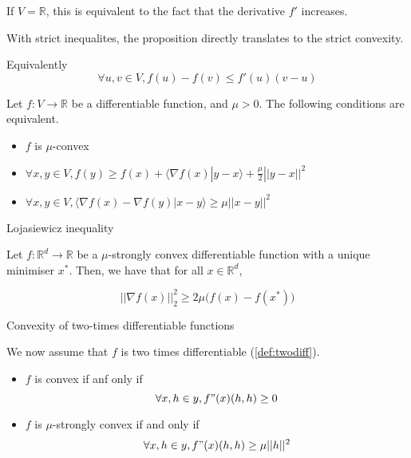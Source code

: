 \documentclass[
10pt, %
a4paper, %
oneside, %
headinclude,footinclude, %
BCOR5mm, %
]{scrartcl}
\begin{document}
\begin{remark}
    If $V=\mathbb{R}$, this is equivalent to the fact that the derivative $f'$ increases.
\end{remark}

\begin{remark}
    With strict inequalites, the proposition directly translates to the strict convexity.
\end{remark}

\begin{remark}
    Equivalently
    \begin{equation*}
	\forall u,v\in V, f(u)-f(v)\leq f'(u)(v-u)
    \end{equation*}
\end{remark}

\begin{proposition}
    \label{prop:alphaconv}
    Let $f:V \rightarrow \mathbb{R} $ be a differentiable function, and $\mu>0$. The following conditions are equivalent.
    \begin{itemize}
        \item $f$ is $ \mu$-convex
	\item $\forall x, y\in V, f(y)\geq f(x)+\langle\nabla f(x)|y-x\rangle+ \frac{  \mu}{2} ||y-x||^2$
	\item $\forall x, y\in V, \langle\nabla f(x)-\nabla f(y)|x-y\rangle\geq \mu ||x-y||^2$
    \end{itemize}
\end{proposition}

\begin{lemma}{Lojasiewicz inequality}

    Let $f: \mathbb{R}^d\rightarrow \mathbb{R} $ be a $\mu$-strongly convex differentiable function with a unique minimiser $x^*$. Then, we have that for all $x\in \mathbb{R}^d$, 

    \begin{equation}
	||\nabla f (x)||_2^2\geq 2\mu \big(f(x)-f(x^*)\big)
    \end{equation}
\end{lemma}

\begin{proposition}{Convexity of two-times differentiable functions}

    We now assume that $f$ is two times differentiable (\ref{def:twodiff}).

    \begin{itemize}
	\item $f$ is convex if anf only if
	    \begin{equation*}
		\forall x, h\in y, f"(x)(h, h)\geq 0
	    \end{equation*}
	\item $f$ is $\mu$-strongly convex if and only if
	    \begin{equation*}
		\forall x, h\in y, f"(x)(h, h)\geq \mu ||h||^2
	    \end{equation*}
    \end{itemize}

\end{proposition}
\end{document}
